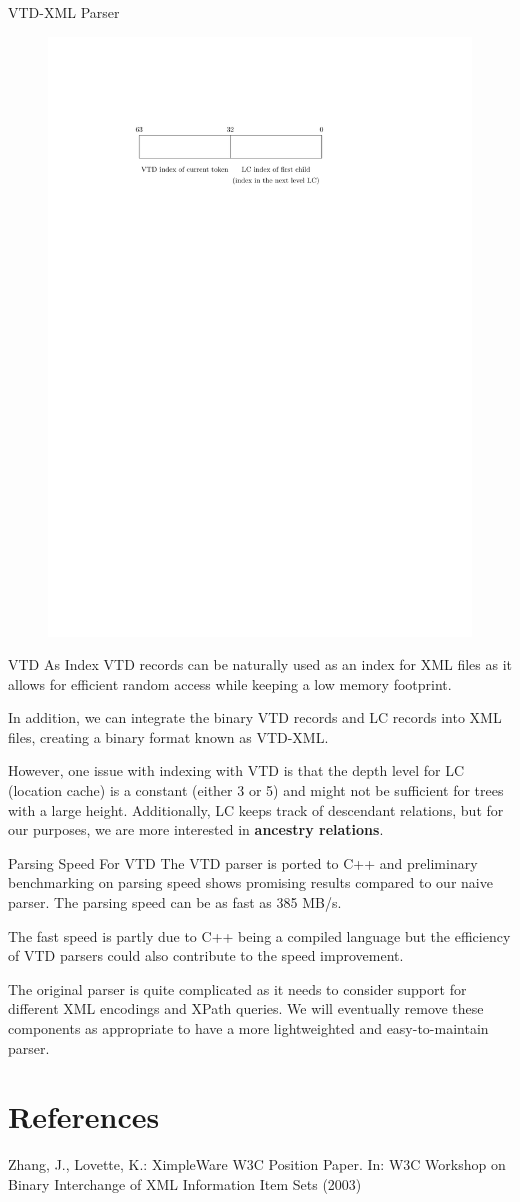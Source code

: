 \documentclass{beamer}
\begin{document}
\begin{frame}{VTD-XML Parser}
    \begin{figure}[htbp]
        \centering
        \includegraphics[width=0.5\linewidth]{res/lc-record-schematic.pdf}
    \end{figure}
\end{frame}

\begin{frame}{VTD As Index}
    VTD records can be naturally used as an index for XML files as it allows for efficient random access while keeping a low memory footprint.

    In addition, we can integrate the binary VTD records and LC records into XML files, creating a binary format known as VTD-XML.

    However, one issue with indexing with VTD is that the depth level for LC (location cache) is a constant (either 3 or 5) and might not be sufficient for trees with a large height. Additionally, LC keeps track of descendant relations, but for our purposes, we are more interested in \textbf{ancestry relations}.
\end{frame}

\begin{frame}{Parsing Speed For VTD}
    The VTD parser is ported to C++ and preliminary benchmarking on parsing speed shows promising results compared to our naive parser. The parsing speed can be as fast as 385 MB/s. 
    
    The fast speed is partly due to C++ being a compiled language but the efficiency of VTD parsers could also contribute to the speed improvement.

    The original parser is quite complicated as it needs to consider support for different XML encodings and XPath queries. We will eventually remove these components as appropriate to have a more lightweighted and easy-to-maintain parser.
\end{frame}

\section{References}

\begin{frame}
    \scriptsize

    Zhang, J., Lovette, K.: XimpleWare W3C Position Paper. In: W3C Workshop on Binary Interchange of XML Information Item Sets (2003)
\end{frame}
\end{document}
